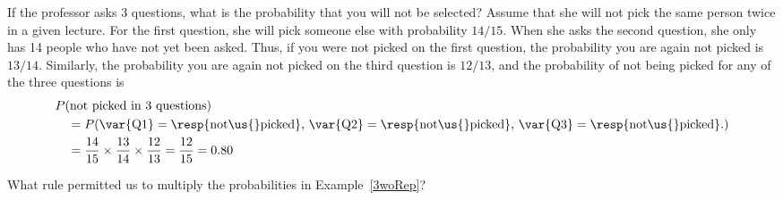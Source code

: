 \begin{examplewrap}
\begin{nexample}{If the professor asks 3 questions, what is the probability that you will not be selected? Assume that she will not pick the same person twice in a given lecture.}\label{3woRep}
For the first question, she will pick someone else with probability $14/15$. When she asks the second question, she only has 14 people who have not yet been asked. Thus, if you were not picked on the first question, the probability you are again not picked is $13/14$. Similarly, the probability you are again not picked on the third question is $12/13$, and the probability of not being picked for any of the three questions is
\begin{align*}
&P(\text{not picked in 3 questions}) \\
&\quad = P(\text{\var{Q1}} = \text{\resp{not\us{}picked}, }\text{\var{Q2}} = \text{\resp{not\us{}picked}, }\text{\var{Q3}} = \text{\resp{not\us{}picked}.}) \\
&\quad = \frac{14}{15}\times\frac{13}{14}\times\frac{12}{13} = \frac{12}{15} = 0.80
\end{align*}
\end{nexample}
\end{examplewrap}

\begin{exercisewrap}
\begin{nexercise}
What rule permitted us to multiply the probabilities in Example~\ref{3woRep}?\footnotemark
\end{nexercise}
\end{exercisewrap}

